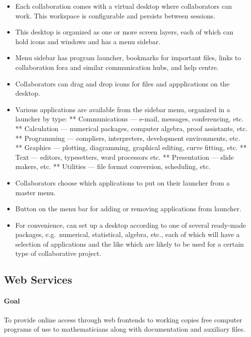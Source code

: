 \begin{itemize}
\item
  Each collaboration comes with a virtual desktop where collaborators
  can work. This workspace is configurable and persists between
  sessions.
\item
  This desktop is organized as one or more screen layers, each of which
  can hold icons and windows and has a menu sidebar.
\item
  Menu sidebar has program launcher, bookmarks for important files,
  links to collaboration fora and similar communication hubs, and help
  centre.
\item
  Collaborators can drag and drop icons for files and appplications on
  the desktop.
\item
  Various applications are available from the sidebar menu, organized in
  a launcher by type: ** Communications --- e-mail, messages,
  conferencing, etc. ** Calculation --- numerical packages, computer
  algebra, proof assistants, etc. ** Programming --- compliers,
  interpreters, development environments, etc. ** Graphics --- plotting,
  diagramming, graphical editing, curve fitting, etc. ** Text ---
  editors, typesetters, word processors etc. ** Presentation --- slide
  makers, etc. ** Utilities --- file format conversion, scheduling, etc.
\item
  Collaborators choose which applications to put on their launcher from
  a master menu.
\item
  Button on the menu bar for adding or removing applications from
  launcher.
\item
  For convenience, can set up a desktop according to one of several
  ready-made packages, e.g.~numerical, statistical, algebra, etc., each
  of which will have a selection of applications and the like which are
  likely to be used for a certain type of collaborative project.
\end{itemize}

\subsection{Web Services}

\paragraph{Goal} To provide online access through web frontends to working copies
free computer programs of use to mathematicians along with documentation
and auxiliary files.

